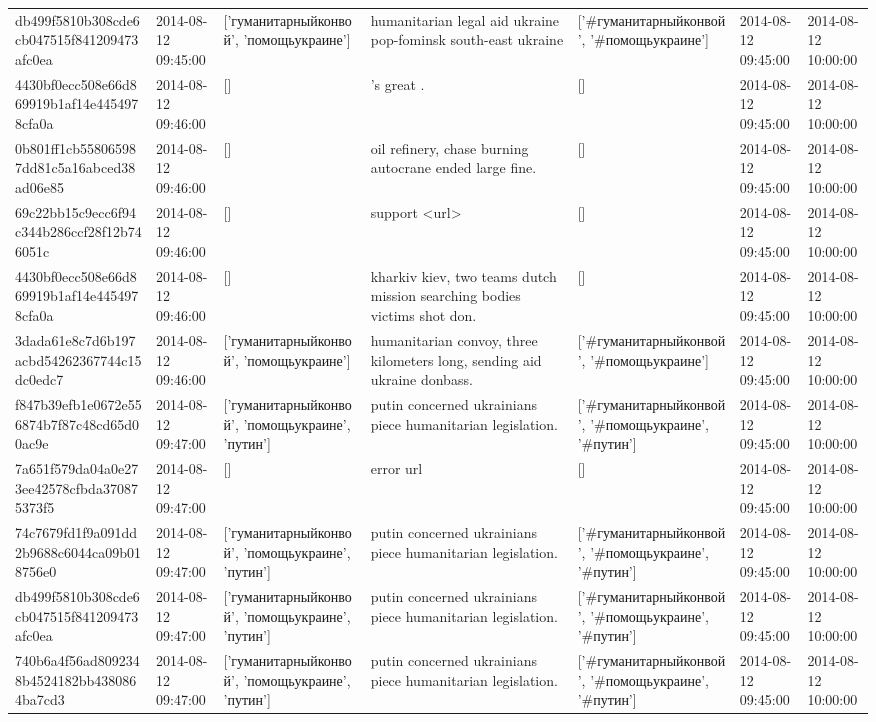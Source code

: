 \begin{tabular}{lllllll}
db499f5810b308cde6cb047515f841209473afc0ea & 2014-08-12 09:45:00 & ['гуманитарныйконвой', 'помощьукраине'] & humanitarian legal aid ukraine pop-fominsk south-east ukraine & ['#гуманитарныйконвой', '#помощьукраине'] & 2014-08-12 09:45:00 & 2014-08-12 10:00:00 \\
4430bf0ecc508e66d869919b1af14e4454978cfa0a & 2014-08-12 09:46:00 & [] & 's great . & [] & 2014-08-12 09:45:00 & 2014-08-12 10:00:00 \\
0b801ff1cb558065987dd81c5a16abced38ad06e85 & 2014-08-12 09:46:00 & [] & oil refinery, chase burning autocrane ended large fine. & [] & 2014-08-12 09:45:00 & 2014-08-12 10:00:00 \\
69c22bb15c9ecc6f94c344b286ccf28f12b746051c & 2014-08-12 09:46:00 & [] & support <url> & [] & 2014-08-12 09:45:00 & 2014-08-12 10:00:00 \\
4430bf0ecc508e66d869919b1af14e4454978cfa0a & 2014-08-12 09:46:00 & [] & kharkiv kiev, two teams dutch mission searching bodies victims shot don. & [] & 2014-08-12 09:45:00 & 2014-08-12 10:00:00 \\
3dada61e8c7d6b197acbd54262367744c15dc0edc7 & 2014-08-12 09:46:00 & ['гуманитарныйконвой', 'помощьукраине'] & humanitarian convoy, three kilometers long, sending aid ukraine donbass. & ['#гуманитарныйконвой', '#помощьукраине'] & 2014-08-12 09:45:00 & 2014-08-12 10:00:00 \\
f847b39efb1e0672e556874b7f87c48cd65d00ac9e & 2014-08-12 09:47:00 & ['гуманитарныйконвой', 'помощьукраине', 'путин'] & putin concerned ukrainians piece humanitarian legislation. & ['#гуманитарныйконвой', '#помощьукраине', '#путин'] & 2014-08-12 09:45:00 & 2014-08-12 10:00:00 \\
7a651f579da04a0e273ee42578cfbda370875373f5 & 2014-08-12 09:47:00 & [] & error url & [] & 2014-08-12 09:45:00 & 2014-08-12 10:00:00 \\
74c7679fd1f9a091dd2b9688c6044ca09b018756e0 & 2014-08-12 09:47:00 & ['гуманитарныйконвой', 'помощьукраине', 'путин'] & putin concerned ukrainians piece humanitarian legislation. & ['#гуманитарныйконвой', '#помощьукраине', '#путин'] & 2014-08-12 09:45:00 & 2014-08-12 10:00:00 \\
db499f5810b308cde6cb047515f841209473afc0ea & 2014-08-12 09:47:00 & ['гуманитарныйконвой', 'помощьукраине', 'путин'] & putin concerned ukrainians piece humanitarian legislation. & ['#гуманитарныйконвой', '#помощьукраине', '#путин'] & 2014-08-12 09:45:00 & 2014-08-12 10:00:00 \\
740b6a4f56ad8092348b4524182bb4380864ba7cd3 & 2014-08-12 09:47:00 & ['гуманитарныйконвой', 'помощьукраине', 'путин'] & putin concerned ukrainians piece humanitarian legislation. & ['#гуманитарныйконвой', '#помощьукраине', '#путин'] & 2014-08-12 09:45:00 & 2014-08-12 10:00:00 \\

\end{tabular}
